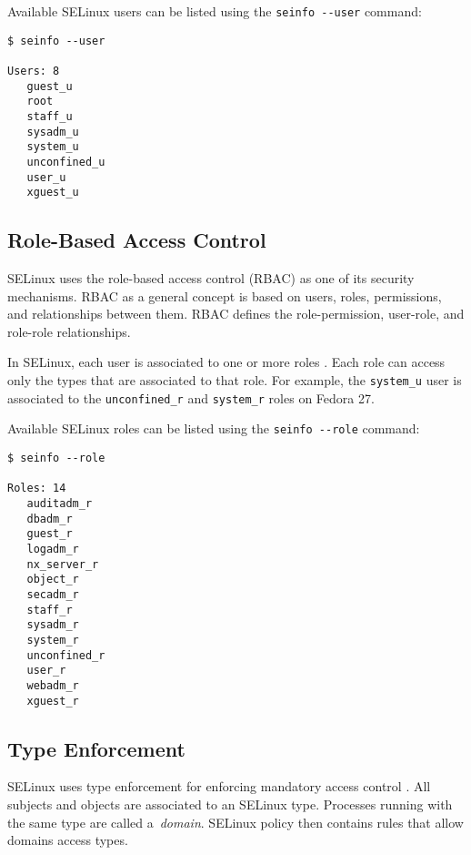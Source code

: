 \pagebreak

Available SELinux users can be listed using the \texttt{seinfo -{}-user}
command:
\begin{lstlisting}
$ seinfo --user

Users: 8
   guest_u
   root
   staff_u
   sysadm_u
   system_u
   unconfined_u
   user_u
   xguest_u
\end{lstlisting}

\subsection{Role-Based Access Control}
\label{rbac}
SELinux uses the role-based access control (RBAC) as one of its security
mechanisms. RBAC as a general concept is based on users, roles, permissions,
and relationships between them. RBAC defines the role-permission, user-role, and
role-role relationships.

In SELinux, each user is associated to one or more roles \cite[p.~24]{tsn}.
Each role can access only the types that are associated to that role. For
example, the \texttt{system\_u} user is associated to the
\texttt{unconfined\_r} and \texttt{system\_r} roles on Fedora 27.

Available SELinux roles can be listed using the \texttt{seinfo -{}-role}
command:
\begin{lstlisting}
$ seinfo --role

Roles: 14
   auditadm_r
   dbadm_r
   guest_r
   logadm_r
   nx_server_r
   object_r
   secadm_r
   staff_r
   sysadm_r
   system_r
   unconfined_r
   user_r
   webadm_r
   xguest_r
\end{lstlisting}

\subsection{Type Enforcement}
\label{te}
SELinux uses type enforcement for enforcing mandatory access control
\cite[pp.~25--26]{tsn}. All subjects and objects are associated to an SELinux
type. Processes running with the same type are called a~\emph{domain}. SELinux
policy then contains rules that allow domains access types.

